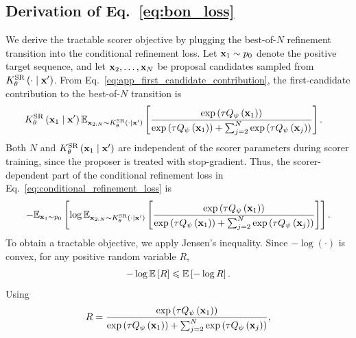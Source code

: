 \subsection{Derivation of Eq.~\eqref{eq:bon_loss}}
\label{app:derive_bon_loss}

We derive the tractable scorer objective by plugging the best-of-$N$ refinement transition into the conditional refinement loss. 
Let $\mathbf{x}_1\sim p_0$ denote the positive target sequence, and let $\mathbf{x}_2,\ldots,\mathbf{x}_N$ be proposal candidates sampled from $K_{\theta}^{\mathrm{SR}}\left(\cdot\mid\mathbf{x}'\right)$. 
From Eq.~\eqref{eq:app_first_candidate_contribution}, the first-candidate contribution to the best-of-$N$ transition is
\begin{equation*}
\begin{aligned}
    &
    K_{\theta}^{\mathrm{SR}}\left(\mathbf{x}_1\mid\mathbf{x}'\right)
    \mathbb{E}_{\mathbf{x}_{2:N}\sim K_{\theta}^{\mathrm{SR}}\left(\cdot\mid\mathbf{x}'\right)}
    \left[
        \frac{
            \exp\left(\tau Q_\psi\left(\mathbf{x}_1\right)\right)
        }{
            \exp\left(\tau Q_\psi\left(\mathbf{x}_1\right)\right)
            +
            \sum_{j=2}^{N}
            \exp\left(\tau Q_\psi\left(\mathbf{x}_j\right)\right)
        }
    \right] .
\end{aligned}
\label{eq:app_positive_transition_contribution}
\end{equation*}
Both $N$ and $K_{\theta}^{\mathrm{SR}}\left(\mathbf{x}_1\mid\mathbf{x}'\right)$ are independent of the scorer parameters during scorer training, since the proposer is treated with stop-gradient. 
Thus, the scorer-dependent part of the conditional refinement loss in Eq.~\eqref{eq:conditional_refinement_loss} is
\begin{equation}
\begin{aligned}
    -
    \mathbb{E}_{\mathbf{x}_1\sim p_0}\left[
    \log
    \mathbb{E}_{\mathbf{x}_{2:N}\sim K_{\theta}^{\mathrm{SR}}\left(\cdot\mid\mathbf{x}'\right)}
    \left[
        \frac{
            \exp\left(\tau Q_\psi\left(\mathbf{x}_1\right)\right)
        }{
            \exp\left(\tau Q_\psi\left(\mathbf{x}_1\right)\right)
            +
            \sum_{j=2}^{N}
            \exp\left(\tau Q_\psi\left(\mathbf{x}_j\right)\right)
        }
    \right]
    \right].
\end{aligned}
\label{eq:app_bon_log_expectation}
\end{equation}
To obtain a tractable objective, we apply Jensen's inequality. 
Since $-\log(\cdot)$ is convex, for any positive random variable $R$,
\begin{equation*}
    -\log \mathbb{E}\left[R\right]
    \leqslant
    \mathbb{E}\left[-\log R\right].
    \label{eq:app_jensen_bon}
\end{equation*}
Using
\begin{equation*}
    R
    =
    \frac{
        \exp\left(\tau Q_\psi\left(\mathbf{x}_1\right)\right)
    }{
        \exp\left(\tau Q_\psi\left(\mathbf{x}_1\right)\right)
        +
        \sum_{j=2}^{N}
        \exp\left(\tau Q_\psi\left(\mathbf{x}_j\right)\right)
    },
\end{equation*}
